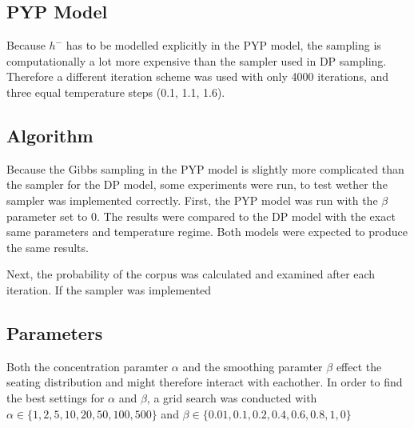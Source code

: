 \subsection{PYP Model}

Because $h^{-}$ has to be modelled explicitly in the PYP model, the sampling is computationally a lot more expensive than the sampler used in DP sampling. Therefore a different iteration scheme was used with only 4000 iterations, and three equal temperature steps (0.1, 1.1, 1.6).

\subsection{Algorithm}
Because the Gibbs sampling in the PYP model is slightly more complicated than the sampler for the DP model, some experiments were run, to test wether the sampler was implemented correctly.
First, the PYP model was run with the $\beta$ parameter set to 0. The results were compared to the DP model with the exact same parameters and temperature regime. Both models were expected to produce the same results.

Next, the probability of the corpus was calculated and examined after each iteration. If the sampler was implemented

\subsection{Parameters}
Both the concentration paramter $\alpha$ and the smoothing paramter $\beta$ effect the seating distribution and might therefore interact with eachother. In order to find the best settings for $\alpha$ and $\beta$, a grid search was conducted with $\alpha \in \{1, 2, 5, 10, 20, 50, 100, 500 \}$ and $\beta \in \{ 0.01, 0.1, 0.2, 0.4,0.6, 0.8, 1, 0 \}$
